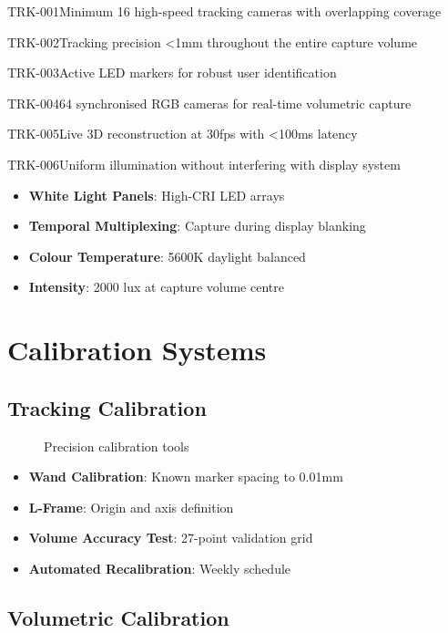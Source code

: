 \begin{requirement}{TRK-001}{Minimum 16 high-speed tracking cameras with overlapping coverage}
\begin{requirement}{TRK-002}{Tracking precision <1mm throughout the entire capture volume}
\begin{requirement}{TRK-003}{Active LED markers for robust user identification}
\begin{requirement}{TRK-004}{64 synchronised RGB cameras for real-time volumetric capture}
\begin{requirement}{TRK-005}{Live 3D reconstruction at 30fps with <100ms latency}
\begin{requirement}{TRK-006}{Uniform illumination without interfering with display system}
\begin{itemize}
    \item \textbf{White Light Panels}: High-CRI LED arrays
    \item \textbf{Temporal Multiplexing}: Capture during display blanking
    \item \textbf{Colour Temperature}: 5600K daylight balanced
    \item \textbf{Intensity}: 2000 lux at capture volume centre
\end{itemize}

\section{Calibration Systems}

\subsection{Tracking Calibration}

\begin{figure}[H]
\centering
{}
\caption{Precision calibration tools}
\end{figure}

\begin{itemize}
    \item \textbf{Wand Calibration}: Known marker spacing to 0.01mm
    \item \textbf{L-Frame}: Origin and axis definition
    \item \textbf{Volume Accuracy Test}: 27-point validation grid
    \item \textbf{Automated Recalibration}: Weekly schedule
\end{itemize}

\subsection{Volumetric Calibration}


\end{requirement}
\end{requirement}
\end{requirement}
\end{requirement}
\end{requirement}
\end{requirement}
